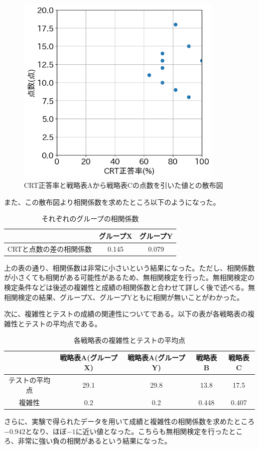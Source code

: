 \begin{figure}[H]
    \begin{center}
        \includegraphics[width=10cm]{figure/groupY_crt_diffAC.png}
        \caption{CRT正答率と戦略表Aから戦略表Cの点数を引いた値との散布図}
    \end{center}
\end{figure}
また、この散布図より相関係数を求めたところ以下のようになった。
\begin{table}[H]
    \begin{center}
    \caption{それぞれのグループの相関係数}
    \begin{tabular}{|c|c|c|}
    \hline
                  & グループX & グループY \\ \hline
    CRTと点数の差の相関係数 & 0.145 & 0.079 \\ \hline
    \end{tabular}
    \end{center}
\end{table}
上の表の通り、相関係数は非常に小さいという結果になった。ただし、相関係数が小さくても相関がある可能性があるため、無相関検定を行った。無相関検定の検定条件などは後述の複雑性と成績の相関係数と合わせて詳しく後で述べる。無相関検定の結果、グループX、グループYともに相関が無いことがわかった。

次に、複雑性とテストの成績の関連性についてである。以下の表が各戦略表の複雑性とテストの平均点である。
\begin{table}[H]
    \begin{center}
        \caption{各戦略表の複雑性とテストの平均点}
    \begin{tabular}{|c|c|c|c|c|}
    \hline
            & 戦略表A(グループX) & 戦略表A(グループY) & 戦略表B  & 戦略表C  \\ \hline
    テストの平均点 & 29.1        & 29.8        & 13.8  & 17.5  \\ \hline
    複雑性     & 0.2         & 0.2         & 0.448 & 0.407 \\ \hline
    \end{tabular}
    \end{center}
\end{table}
さらに、実験で得られたデータを用いて成績と複雑性の相関係数を求めたところ$-0.942$となり、ほぼ$-1$に近い値となった。こちらも無相関検定を行ったところ、非常に強い負の相関があるという結果になった。

